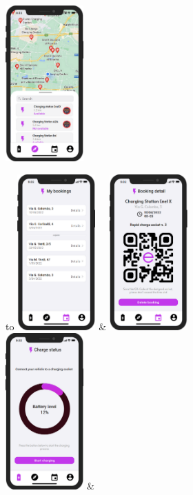 \begin{table}[H]
\begin{tabu}
  \includegraphics[width=30mm]{images/explore1.png}\label{fig:chargingStationMap} \\
\end{tabu}
\end{table}
\begin{table}[H]
\centering
\begin{tabu}to \textwidth {X[c]X[c]}
  \includegraphics[width=30mm]{images/bookings.png}\label{fig:bookingPage} &
  \includegraphics[width=30mm]{images/bookingdetail.png}\label{fig:qrCodePage} \\
  \includegraphics[width=30mm]{images/startcharge.png}\label{fig:startProcess} &

\end{tabu}
\end{table}
